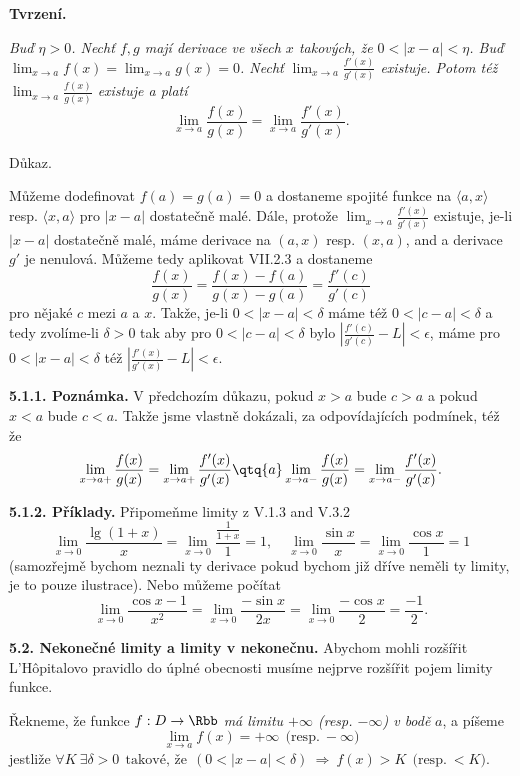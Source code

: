 \documentclass[12pt]{article}
\begin{document}
{ \medskip
 
 {\bf Tvrzení.} {\em Buď $\eta>0$. Nechť $f,g$ mají derivace ve všech $x$ takových, že $0<|x-a|<\eta$. Buď $\lim_{x\to a}f(x)=\lim_{x\to a}g(x)=0$. Nechť $\lim_{x\to a}\frac{f'(x)}{g'(x)}$ existuje.
Potom též $\lim_{x\to a}\frac{f(x)}{g(x)}$ existuje a platí
$$
\lim_{x\to a}\frac{f(x)}{g(x)}=\lim_{x\to a}\frac{f'(x)}{g'(x)}.
$$

Důkaz.} Můžeme dodefinovat $f(a)=g(a)=0$ a dostaneme spojité funkce na $\langle a,x\rangle $ resp. $\langle x,a\rangle$ pro $|x-a|$ dostatečně malé. Dále, protože $\lim_{x\to a}\frac{f'(x)}{g'(x)}$ existuje, je-li $|x-a|$ dostatečně malé, máme derivace na $(a,x)$ resp. $(x,a)$, and  a derivace $g'$ je nenulová. Můžeme tedy aplikovat VII.2.3 a dostaneme
$$
\frac{f(x)}{g(x)}=\frac{f(x)-f(a)}{g(x)-g(a)}=\frac{f'(c)}{g'(c)}
$$
pro nějaké $c$ mezi $a$ a $x$. Takže, je-li $0<|x-a|<\delta$ máme též
$0<|c-a|<\delta$ a tedy zvolíme-li $\delta>0$ tak aby pro $0<|c-a|<\delta$ bylo $|\frac{f'(c)}{g'(c)}-L|<\epsilon$, máme pro
$0<|x-a|<\delta$ též
$|\frac{f'(x)}{g'(x)}-L|<\epsilon$.\sq

\medskip

{\bf 5.1.1. Poznámka.} V předchozím důkazu, pokud  $x>a$ bude $c>a$ a pokud $x<a$ bude $c<a$. Takže jsme vlastně dokázali, za odpovídajících podmínek, t\'e\v z že
$$
\lim_{x\to a+}\frac{f(x)}{g(x)}=\lim_{x\to a+}\frac{f'(x)}{g'(x)}
\qtq{a}
\lim_{x\to a-}\frac{f(x)}{g(x)}=\lim_{x\to a-}\frac{f'(x)}{g'(x)}.
$$

\medskip

{\bf 5.1.2. Příklady.} Připomeňme limity z
V.1.3 and V.3.2
$$
\lim_{x\to 0}\frac{\lg(1+x)}{x}=\lim_{x\to 0}\frac{\frac1{1+x}}{1}=1,\quad
\lim_{x\to 0}\frac{\sin x}{x}=\lim_{x\to 0}\frac{\cos x}{1}=1
$$
(samozřejmě bychom neznali ty derivace pokud bychom již dříve neměli ty limity, je to pouze ilustrace).
Nebo můžeme počítat
$$
\lim_{x\to 0}\frac{\cos x-1}{x^2}=\lim_{x\to 0}\frac{-\sin x}{2x}=
\lim_{x\to 0}\frac{-\cos x}{2}=\frac{-1}2.
$$

\bigskip

{\bf 5.2. Nekonečné limity a limity v nekonečnu.} Abychom mohli rozšířit L'H\^{o}pitalovo pravidlo do úplné obecnosti musíme nejprve rozšířit pojem limity funkce. 

\smallskip

Řekneme, že funkce $f:D\to\Rbb$ {\em má limitu $+\infty$ (resp. $-\infty$) v bodě} $a$, a píšeme
$$
\lim_{x\to a}f(x)= +\infty\ \ \text{(resp.} \ -\infty)
$$
jestliže
 $
 \forall K\ \exists \delta>0\ \ \text{takové, že}\ \ (0< |x-a|<\delta)\ \Rightarrow\ f(x)>K \ \ \text{(resp.} \ <K).
$

}
\end{document}
